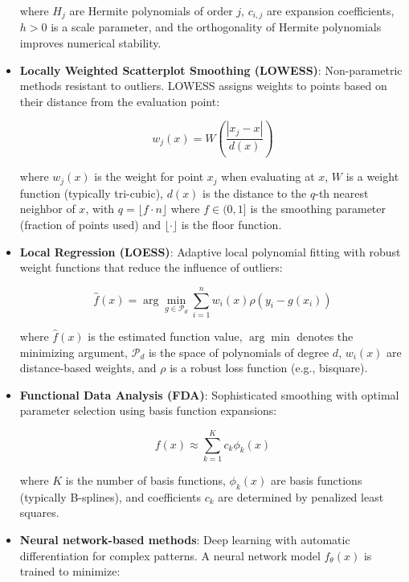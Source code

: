 \documentclass[10pt,journal,compsoc]{IEEEtran}
\begin{document}
\begin{itemize}
    where $H_j$ are Hermite polynomials of order $j$, $c_{i,j}$ are expansion coefficients, $h > 0$ is a scale parameter, and the orthogonality of Hermite polynomials improves numerical stability.
    
    \item \textbf{Locally Weighted Scatterplot Smoothing (LOWESS)}: Non-parametric methods resistant to outliers. LOWESS assigns weights to points based on their distance from the evaluation point:
    
    \begin{equation}
        w_j(x) = W\left(\frac{|x_j - x|}{d(x)}\right)
    \end{equation}
    
    where $w_j(x)$ is the weight for point $x_j$ when evaluating at $x$, $W$ is a weight function (typically tri-cubic), $d(x)$ is the distance to the $q$-th nearest neighbor of $x$, with $q = \lfloor f \cdot n \rfloor$ where $f \in (0,1]$ is the smoothing parameter (fraction of points used) and $\lfloor \cdot \rfloor$ is the floor function.
    
    \item \textbf{Local Regression (LOESS)}: Adaptive local polynomial fitting with robust weight functions that reduce the influence of outliers:
    
    \begin{equation}
        \hat{f}(x) = \arg\min_{g \in \mathcal{P}_d} \sum_{i=1}^{n} w_i(x) \rho\left(y_i - g(x_i)\right)
    \end{equation}
    
    where $\hat{f}(x)$ is the estimated function value, $\arg\min$ denotes the minimizing argument, $\mathcal{P}_d$ is the space of polynomials of degree $d$, $w_i(x)$ are distance-based weights, and $\rho$ is a robust loss function (e.g., bisquare).
    
    \item \textbf{Functional Data Analysis (FDA)}: Sophisticated smoothing with optimal parameter selection using basis function expansions:
    
    \begin{equation}
        f(x) \approx \sum_{k=1}^{K} c_k \phi_k(x)
    \end{equation}
    
    where $K$ is the number of basis functions, $\phi_k(x)$ are basis functions (typically B-splines), and coefficients $c_k$ are determined by penalized least squares.
    
    \item \textbf{Neural network-based methods}: Deep learning with automatic differentiation for complex patterns. A neural network model $f_{\theta}(x)$ is trained to minimize:
    

\end{itemize}
\end{document}
